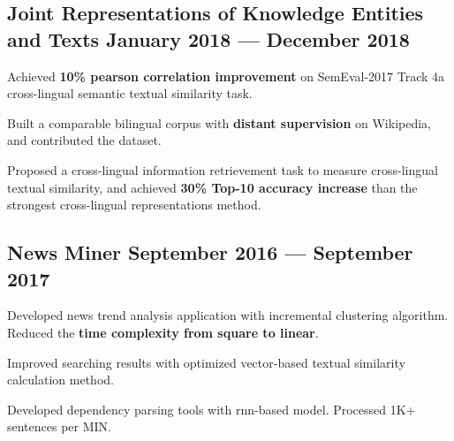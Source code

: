 \subsection*{Joint Representations of Knowledge Entities and Texts \hfill January 2018 --- December 2018} 
    \begin{zitemize}
        \item Achieved \textbf{10\% pearson correlation improvement} on SemEval-2017 Track 4a cross-lingual semantic textual similarity task.
        \item Built a comparable bilingual corpus with \textbf{distant supervision} on Wikipedia, and contributed the dataset.
        \item Proposed a cross-lingual information retrievement task to measure cross-lingual textual similarity, and achieved \textbf{30\% Top-10 accuracy increase} than the strongest cross-lingual representations method.
    \end{zitemize}


\subsection*{News Miner \hfill September 2016 --- September 2017} 
    \begin{zitemize}
        \item Developed news trend analysis application with incremental clustering algorithm. Reduced the \textbf{time complexity from square to linear}.
        \item Improved searching results with optimized vector-based textual similarity calculation method.
        \item Developed dependency parsing tools with rnn-based model. Processed 1K+ sentences per MIN.
    \end{zitemize}
